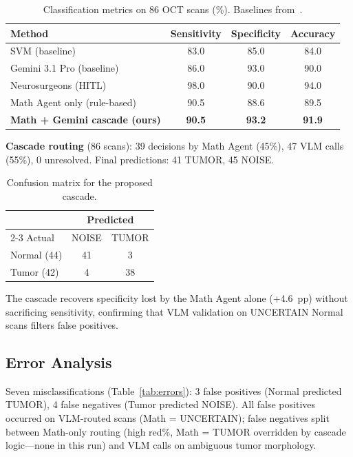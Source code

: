 \documentclass[11pt]{article}
\begin{document}
\begin{table}[ht]
  \centering
  \caption{Classification metrics on 86 OCT scans (\%). Baselines from~\cite{mdpi2024}.}
  \label{tab:metrics}
  \begin{tabular}{lccc}
    \toprule
    Method & Sensitivity & Specificity & Accuracy \\
    \midrule
    SVM (baseline)~\cite{mdpi2024}         & 83.0 & 85.0 & 84.0 \\
    Gemini 3.1 Pro (baseline)~\cite{mdpi2024} & 86.0 & 93.0 & 90.0 \\
    Neurosurgeons (HITL)~\cite{mdpi2024}   & 98.0 & 90.0 & 94.0 \\
    \midrule
    Math Agent only (rule-based)           & 90.5 & 88.6 & 89.5 \\
    \textbf{Math + Gemini cascade (ours)}  & \textbf{90.5} & \textbf{93.2} & \textbf{91.9} \\
    \bottomrule
  \end{tabular}
\end{table}

\textbf{Cascade routing} (86 scans): 39 decisions by Math Agent (45\%), 47 VLM calls (55\%), 0 unresolved.
Final predictions: 41 TUMOR, 45 NOISE.

\begin{table}[ht]
  \centering
  \caption{Confusion matrix for the proposed cascade.}
  \label{tab:confusion}
  \begin{tabular}{lcc}
    \toprule
    & \multicolumn{2}{c}{Predicted} \\
    \cmidrule(lr){2-3}
    Actual & NOISE & TUMOR \\
    \midrule
    Normal (44) & 41 & 3 \\
    Tumor (42)  & 4  & 38 \\
    \bottomrule
  \end{tabular}
\end{table}

The cascade recovers specificity lost by the Math Agent alone (+4.6~pp) without sacrificing sensitivity, confirming that VLM validation on UNCERTAIN Normal scans filters false positives.

\subsection{Error Analysis}

Seven misclassifications (Table~\ref{tab:errors}): 3 false positives (Normal predicted TUMOR), 4 false negatives (Tumor predicted NOISE).
All false positives occurred on VLM-routed scans (Math = UNCERTAIN); false negatives split between Math-only routing (high red\%, Math = TUMOR overridden by cascade logic---none in this run) and VLM calls on ambiguous tumor morphology.
\end{document}
